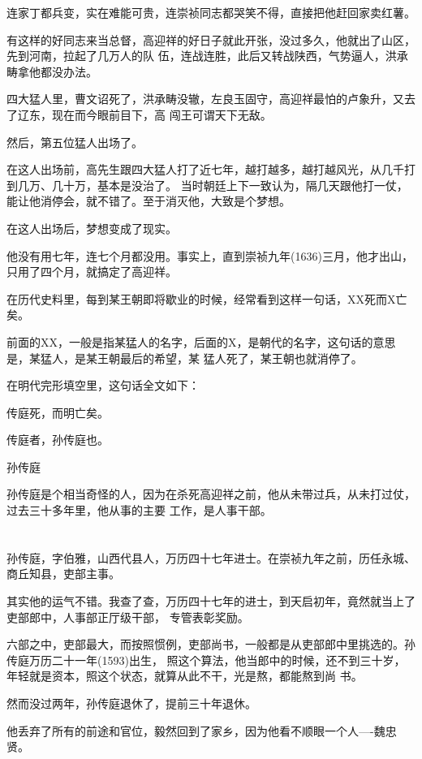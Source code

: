 \documentclass[11pt,a4paper,onecolumn]{article}
\begin{document}
连家丁都兵变，实在难能可贵，连崇祯同志都哭笑不得，直接把他赶回家卖红薯。

有这样的好同志来当总督，高迎祥的好日子就此开张，没过多久，他就出了山区，先到河南，拉起了几万人的队
伍，连战连胜，此后又转战陕西，气势逼人，洪承畴拿他都没办法。

四大猛人里，曹文诏死了，洪承畴没辙，左良玉固守，高迎祥最怕的卢象升，又去了辽东，现在而今眼前目下，高
闯王可谓天下无敌。

然后，第五位猛人出场了。

在这人出场前，高先生跟四大猛人打了近七年，越打越多，越打越风光，从几千打到几万、几十万，基本是没治了。
当时朝廷上下一致认为，隔几天跟他打一仗，能让他消停会，就不错了。至于消灭他，大致是个梦想。

在这人出场后，梦想变成了现实。

他没有用七年，连七个月都没用。事实上，直到崇祯九年(1636)三月，他才出山，只用了四个月，就搞定了高迎祥。

在历代史料里，每到某王朝即将歇业的时候，经常看到这样一句话，XX死而X亡矣。

前面的XX，一般是指某猛人的名字，后面的X，是朝代的名字，这句话的意思是，某猛人，是某王朝最后的希望，某
猛人死了，某王朝也就消停了。

在明代完形填空里，这句话全文如下：

传庭死，而明亡矣。

传庭者，孙传庭也。

孙传庭

孙传庭是个相当奇怪的人，因为在杀死高迎祥之前，他从未带过兵，从未打过仗，过去三十多年里，他从事的主要
工作，是人事干部。

\section[\thesection]{}

孙传庭，字伯雅，山西代县人，万历四十七年进士。在崇祯九年之前，历任永城、商丘知县，吏部主事。

其实他的运气不错。我查了查，万历四十七年的进士，到天启初年，竟然就当上了吏部郎中，人事部正厅级干部，
专管表彰奖励。

六部之中，吏部最大，而按照惯例，吏部尚书，一般都是从吏部郎中里挑选的。孙传庭万历二十一年(1593)出生，
照这个算法，他当郎中的时候，还不到三十岁，年轻就是资本，照这个状态，就算从此不干，光是熬，都能熬到尚
书。

然而没过两年，孙传庭退休了，提前三十年退休。

他丢弃了所有的前途和官位，毅然回到了家乡，因为他看不顺眼一个人----魏忠贤。
\end{document}
